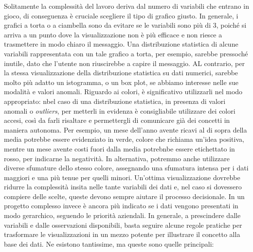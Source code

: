 Solitamente la complessità del lavoro deriva dal numero di variabili che entrano in gioco, di conseguenza è cruciale scegliere il tipo di grafico giusto.
In generale, i grafici a torta o a ciambella sono da evitare se le variabili sono più di 3, poiché si arriva a un punto dove la visualizzazione non è più efficace e non riesce a trasmettere in modo chiaro il messaggio. Una distribuzione statistica di alcune variabili rappresentata con un tale grafico a torta, per esempio, sarebbe pressoché inutile, dato che l'utente non riuscirebbe a capire il messaggio. AL contrario, per la stessa visualizzazione della distribuzione statistica su dati numerici, sarebbe molto più adatto un istogramma, o un box plot, se abbiamo interesse nelle sue modalità e valori anomali.
Riguardo ai colori, è significativo utilizzarli nel modo appropriato: nbel caso di una distribuzione statistica, in presenza di valori anomali o \textit{outliers}, per metterli in evidenza è consigliabile utilizzare dei colori accesi, così da farli risaltare e permettergli di comunicare già dei concetti in maniera autonoma. Per esempio, un mese dell'anno avente ricavi al di sopra della media potrebbe essere evidenziato in verde, colore che richiama un'idea positiva, mentre un mese avente costi fuori dalla media potrebnbe essere etichettato in rosso, per indicarne la negatività. In alternativa, potremmo anche utilizzare diverse sfumature dello stesso colore, assegnando una sfumatura intensa per i dati maggiori e una più tenue per quelli minori.
Un'ottima visualizzazione dovrebbe ridurre la complessità insita nelle tante variabili dei dati e, nel caso si dovessero compiere delle scelte, queste devono sempre aiutare il processo decisionale. In un progetto complesso invece è ancora più indicato se i dati vengono presentati in modo gerarchico, seguendo le priorità aziendali.
In generale, a prescindere dalle variabili e dalle osservazioni disponibili, basta seguire alcune regole pratiche per trasformare le visualizzazioni in un mezzo potente per illustrare il concetto alla base dei dati. Ne esistono tantissime, ma queste sono quelle principali:
